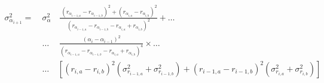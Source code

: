 


\begin{eqnarray*}
  \sigma_{\alpha_{i+1}}^2 = \ & \sigma_\alpha^2 & \, \frac{\
			       {\left( r_{\alpha_{i-1,a}} - r_{\alpha_{i-1,b}} \right)}^2 + {\left( r_{\alpha_{i,a}} - r_{\alpha_{i,b}} \right)}^2 } {{\left( r_{\alpha_{i-1,a}} - r_{\alpha_{i-1,b}} - r_{\alpha_{i,a}} + r_{\alpha_{i,b}} \right)}^2} + \ldots \\
          & \ldots & \, \frac{{\left( \alpha_{i} - \alpha_{i-1} \right)}^2} {{\left( r_{\alpha_{i-1,a}} - r_{\alpha_{i-1,b}} - r_{\alpha_{i,a}} + r_{\alpha_{i,b}} \right)}^4} \times \ldots \\
          & \ldots &\left[{\left( r_{i,a} - r_{i,b} \right) }^2 \left( \sigma_{r_{i-1,a}}^2 + \sigma_{r_{i-1,b}}^2 \right) + {\left( r_{i-1,a} - r_{i-1,b} \right) }^2 \left( \sigma_{r_{i,a}}^2 + \sigma_{r_{i,b}}^2 \right) \right]
\end{eqnarray*}

